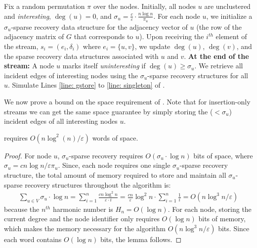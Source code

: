 \documentclass{theoretics}
\newcommand{\truncatedpivot}{\textrm{Truncated-Pivot}\xspace}
\newcommand{\eps}{\ensuremath{\varepsilon}}
\let\oldnl\nl%
\newcommand{\nonl}{\renewcommand{\nl}{\let\nl\oldnl}}%
\begin{document}
{\begin{algorithm}[tbh]
   \setcounter{AlgoLine}{0}
\caption{Dynamic Semi-Streaming \truncatedpivot}\label{alg:dynamic-delta-pivot}
    Fix a random permutation $\pi$ over the nodes. \;
    Initially, all nodes $u$ are unclustered and \emph{interesting}, $\deg(u) = 0$, and $\sigma_u = \frac{c}{\eps} \cdot \frac{n\log n}{\pi_u}$. \;
    For each node $u$, we initialize a $\sigma_u$-sparse recovery data structure for the adjacency vector of $u$ (the row of the adjacency matrix of $G$ that corresponds to $u$). \;
    Upon receiving the $i^{th}$ element of the stream, $s_i = (e_i, \delta_i)$ where $e_i=\{u,v\}$, we update $\deg(u)$, $\deg(v)$, and the sparse recovery data structures associated with $u$ and $v$. \;
  \nonl  \textbf{At the end of the stream:}\;
    A node $u$ marks itself \emph{uninteresting} if $\deg(u) \geq \sigma_{u}$. \;
    We retrieve all incident edges of interesting nodes using the ${\sigma_u}$-sparse recovery structures for all $u$. \;
    Simulate Lines \ref{line: gstore} to \ref{line: singleton} of .\;
\end{algorithm} 
We now prove a bound on the space requirement of . Note that for insertion-only streams we can get the same space guarantee by simply storing the ($<\sigma_u$) incident edges of all interesting nodes $u$.

\begin{lemma}\label{lem: space-req-dynamic-alg}
     requires $O(n\log^2 (n)/\eps)$ words of space. 
\end{lemma}
\begin{proof}
    For node $u$, ${\sigma_u}$-sparse recovery requires $O(\sigma_u\cdot\log n)$ bits of space, where $\sigma_u = c n\log n / \eps \pi_u$. 
    Since, each node requires one single ${\sigma_u}$-sparse recovery structure, the total amount of memory required to store and maintain all ${\sigma_u}$-sparse recovery structures throughout the algorithm is: 
    \begin{align*}
        \sum_{u\in V} \sigma_u\cdot \log n = \sum_{i=1}^n \frac{c n\log^2 n}{\eps\cdot i} = \frac{cn}{\eps}\log^2n \cdot \sum_{i=1}^n\frac{1}{i} = O(n\log^3 n/\eps)
    \end{align*}
    because the $n^{th}$ harmonic number is $H_n = O(\log n)$. 
    For each node, storing the current degree and the node identifier only requires $O(\log n)$ bits of memory, which makes the memory necessary for the algorithm $O(n\log^3 n/\eps)$ bits. 
    Since each word contains $O(\log n)$ bits, the lemma follows.
\end{proof}

}
\end{document}
